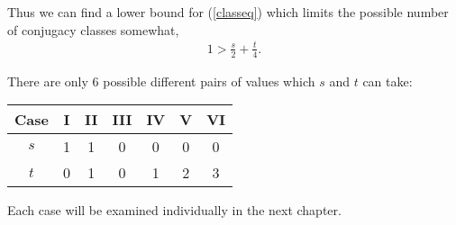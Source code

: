 Thus we can find a lower bound for (\ref{classeq}) which limits the possible number of conjugacy classes somewhat,
\begin{align*} 1 > \frac{s}{2} + \frac{t}{4}.
\end{align*}

There are only 6 possible different pairs of values which $s$ and $t$ can take: \vspace{3mm}

\begin{center}
\centering
  \begin{tabular}{||c||c|c|c|c|c|c||}
\hline
Case & I & II & III & IV & V & VI \\ [1ex]
\hline\hline
 $s$ & 1 & 1 & 0 & 0 & 0 & 0 \\ [1ex]
\hline
$t$ & 0 & 1 & 0 & 1 & 2 & 3 \\ [1ex]
 \hline
\end{tabular}
\end{center}
\vspace{2mm}

Each case will be examined individually in the next chapter.